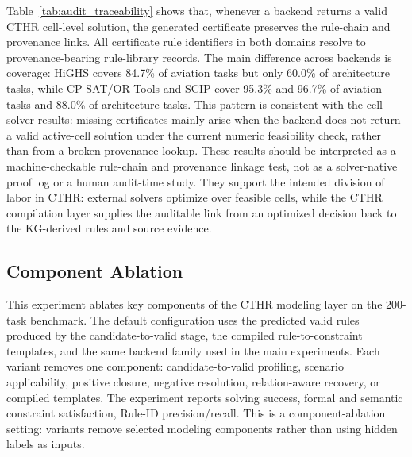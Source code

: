 ﻿\documentclass[a4paper,fleqn]{cas-dc}
\newcommand{\CTHR}{\textsc{CTHR}}
\begin{document}
Table~\ref{tab:audit_traceability} shows that, whenever a backend returns a
valid \CTHR{} cell-level solution, the generated certificate preserves the
rule-chain and provenance links. All certificate rule identifiers in both
domains resolve to provenance-bearing rule-library records. The main difference
across backends is coverage: HiGHS covers 84.7\% of aviation tasks but only
60.0\% of architecture tasks, while CP-SAT/OR-Tools and SCIP cover 95.3\% and
96.7\% of aviation tasks and 88.0\% of architecture tasks. This pattern is
consistent with the cell-solver results: missing certificates mainly arise
when the backend does not return a valid active-cell solution under the current
numeric feasibility check, rather than from a broken provenance lookup. These
results should be interpreted as a machine-checkable rule-chain and provenance
linkage test, not as a solver-native proof log or a human audit-time study.
They support the intended division of labor in \CTHR{}: external solvers
optimize over feasible cells, while the \CTHR{} compilation layer supplies the
auditable link from an optimized decision back to the KG-derived rules and
source evidence.
\FloatBarrier



\subsection{Component Ablation}
\label{sec:ablation_exp}

This experiment ablates key components of the \CTHR{} modeling layer on the 200-task benchmark. The default configuration uses the predicted valid
rules produced by the candidate-to-valid stage, the compiled
rule-to-constraint templates, and the same backend family used in the main
experiments. Each variant removes one component: candidate-to-valid profiling,
scenario applicability, positive closure, negative resolution,
relation-aware recovery, or compiled templates. The experiment reports solving success,
formal and semantic constraint satisfaction, Rule-ID precision/recall. This is a component-ablation setting: variants remove
selected modeling components rather than using hidden labels as inputs.
\end{document}
